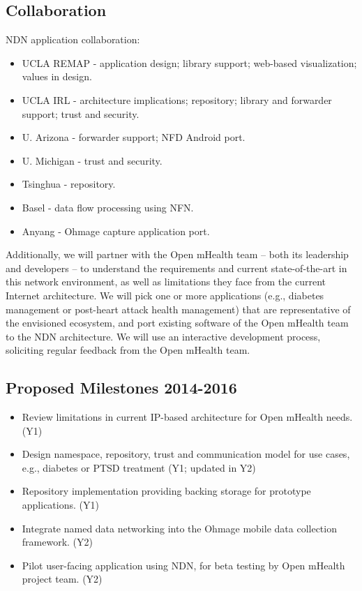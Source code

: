 \subsection{Collaboration}

NDN application collaboration:
\begin{itemize}
\item UCLA REMAP - application design; library support; web-based visualization; values in design.
\item UCLA IRL - architecture implications; repository; library and forwarder support; trust and security. 
\item U. Arizona - forwarder support; NFD Android port. 
\item U. Michigan - trust and security.
\item Tsinghua - repository. 
\item Basel - data flow processing using NFN.
\item Anyang - Ohmage capture application port. 
\end{itemize}

Additionally, we will partner with the Open mHealth team -- both its leadership and
developers -- to understand the requirements and current state-of-the-art
in this network environment, as well as limitations they face from the
current Internet architecture. We will pick one or more 
applications (e.g., diabetes management or post-heart attack health management) 
that are representative of the envisioned ecosystem, and port existing software
of the Open mHealth team to the NDN architecture.  We will use an interactive
development process, soliciting regular feedback from the Open mHealth team.   


\subsection{Proposed Milestones 2014-2016}

\begin{itemize}
\item Review limitations in current IP-based architecture for Open mHealth needs. (Y1)
\item Design namespace, repository, trust and communication model for use cases, e.g., diabetes or PTSD treatment (Y1; updated in Y2)
\item Repository implementation providing backing storage for prototype applications. (Y1)
\item Integrate named data networking into the Ohmage mobile data collection framework. (Y2)
\item Pilot user-facing application using NDN, for beta testing by Open mHealth project team. (Y2)
\end{itemize}






